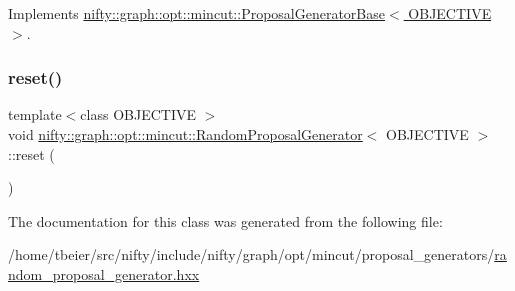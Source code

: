 Implements \hyperlink{classnifty_1_1graph_1_1opt_1_1mincut_1_1ProposalGeneratorBase_a9c2fd90058277ec51ae024110a095860}{nifty\+::graph\+::opt\+::mincut\+::\+Proposal\+Generator\+Base$<$ O\+B\+J\+E\+C\+T\+I\+V\+E $>$}.

\mbox{\label{classnifty_1_1graph_1_1opt_1_1mincut_1_1RandomProposalGenerator_ac2857db1b267f6419ae62b5c31b64dac}} 
\subsubsection{\texorpdfstring{reset()}{reset()}}
{\footnotesize\ttfamily template$<$class O\+B\+J\+E\+C\+T\+I\+VE $>$ \\
void \hyperlink{classnifty_1_1graph_1_1opt_1_1mincut_1_1RandomProposalGenerator}{nifty\+::graph\+::opt\+::mincut\+::\+Random\+Proposal\+Generator}$<$ O\+B\+J\+E\+C\+T\+I\+VE $>$\+::reset (\begin{DoxyParamCaption}{ }\end{DoxyParamCaption})\hspace{0.3cm}{\ttfamily [inline]}}



The documentation for this class was generated from the following file\+:\begin{DoxyCompactItemize}
\item 
/home/tbeier/src/nifty/include/nifty/graph/opt/mincut/proposal\+\_\+generators/\hyperlink{random__proposal__generator_8hxx}{random\+\_\+proposal\+\_\+generator.\+hxx}\end{DoxyCompactItemize}
